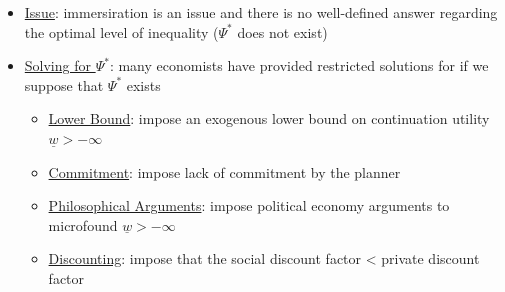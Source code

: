 \documentclass{article}
\begin{document}
\begin{itemize}
\begin{itemize}
        \item  \underline{Issue}: immersiration is an issue and there is no well-defined answer regarding the optimal level of inequality ($\Psi^{*}$ does not exist)
        \item  \underline{Solving for $\Psi^{*}$}: many economists have provided restricted solutions for if we suppose that $\Psi^{*}$ exists
        \begin{itemize}
            \item  \underline{Lower Bound}: impose an exogenous lower bound on continuation utility $\underline{w} > -\infty$
            \item  \underline{Commitment}: impose lack of commitment by the planner
            \item  \underline{Philosophical Arguments}: impose political economy arguments to microfound $\underline{w} > - \infty$
            \item  \underline{Discounting}: impose that the social discount factor < private discount factor
        \end{itemize}
    \end{itemize}
\end{itemize}

\newpage
\end{document}

